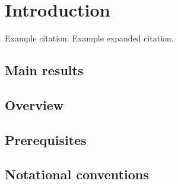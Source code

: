 \chapter{Introduction}

Example citation.\cite{Foncesca-Vaidya_nonorientable} Example expanded citation.\parencite[Remark 3.8]{Mathai_math-review}

\section{Main results}

\section{Overview}

\section{Prerequisites}

\section{Notational conventions}